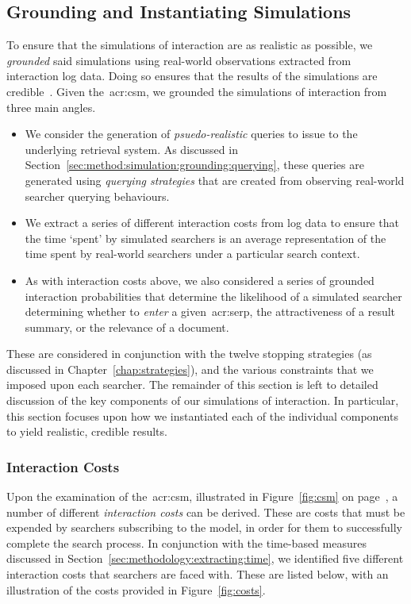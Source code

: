\subsection{Grounding and Instantiating Simulations}\label{sec:method:simulation:grounding}
To ensure that the simulations of interaction are as realistic as possible, we \emph{grounded} said simulations using real-world observations extracted from interaction log data. Doing so ensures that the results of the simulations are credible~\citep{azzopardi2010workshop}. Given the~\gls{acr:csm}, we grounded the simulations of interaction from three main angles.

\begin{itemize}
    \item{ We consider the generation of \emph{psuedo-realistic} queries to issue to the underlying retrieval system. As discussed in Section~\ref{sec:method:simulation:grounding:querying}, these queries are generated using \emph{querying strategies} that are created from observing real-world searcher querying behaviours.}
    \item{ We extract a series of different interaction costs from log data to ensure that the time `spent' by simulated searchers is an average representation of the time spent by real-world searchers under a particular search context.}
    \item{ As with interaction costs above, we also considered a series of grounded interaction probabilities that determine the likelihood of a simulated searcher determining whether to \emph{enter} a given~\gls{acr:serp}, the attractiveness of a result summary, or the relevance of a document.}
\end{itemize}

These are considered in conjunction with the twelve stopping strategies (as discussed in Chapter~\ref{chap:strategies}), and the various constraints that we imposed upon each searcher. The remainder of this section is left to detailed discussion of the key components of our simulations of interaction. In particular, this section focuses upon how we instantiated each of the individual components to yield realistic, credible results.

\subsubsection{Interaction Costs}\label{sec:method:simulation:grounding:costs}
Upon the examination of the~\gls{acr:csm}, illustrated in Figure~\ref{fig:csm} on page~\pageref{fig:csm}, a number of different \emph{interaction costs} can be derived. These are costs that must be expended by searchers subscribing to the model, in order for them to successfully complete the search process. In conjunction with the time-based measures discussed in Section~\ref{sec:methodology:extracting:time}, we identified five different interaction costs that searchers are faced with. These are listed below, with an illustration of the costs provided in Figure~\ref{fig:costs}.

